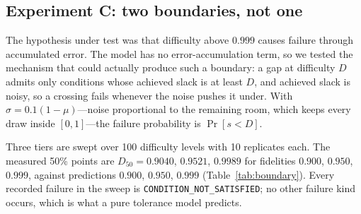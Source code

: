\documentclass[conference]{IEEEtran}
\theoremstyle{definition}
\begin{document}
\subsection{Experiment C: two boundaries, not one}
\label{sec:boundary}

The hypothesis under test was that difficulty above $0.999$ causes failure through
accumulated error. The model has no error-accumulation term, so we tested the
mechanism that could actually produce such a boundary: a gap at difficulty $D$
admits only conditions whose achieved slack is at least $D$, and achieved slack is
noisy, so a crossing fails whenever the noise pushes it under. With
$\sigma=0.1(1-\mu)$---noise proportional to the remaining room, which keeps every
draw inside $[0,1]$---the failure probability is $\Pr[s<D]$.

Three tiers are swept over 100 difficulty levels with 10 replicates each. The
measured 50\% points are $D_{50}=0.9040$, $0.9521$, $0.9989$ for fidelities
$0.900$, $0.950$, $0.999$, against predictions $0.900$, $0.950$, $0.999$
(Table~\ref{tab:boundary}). Every recorded failure in the sweep is
\texttt{CONDITION\_NOT\_SATISFIED}; no other failure kind occurs, which is what a
pure tolerance model predicts.

\begin{table}[t]
\centering
\caption{The statistical boundary moves with fidelity. $D_{50}$ is interpolated in
$\log(1-D)$; the grid bracket is \SI{0.084}{} decades wide.}
\label{tab:boundary}
\footnotesize

\end{table}
\end{document}
